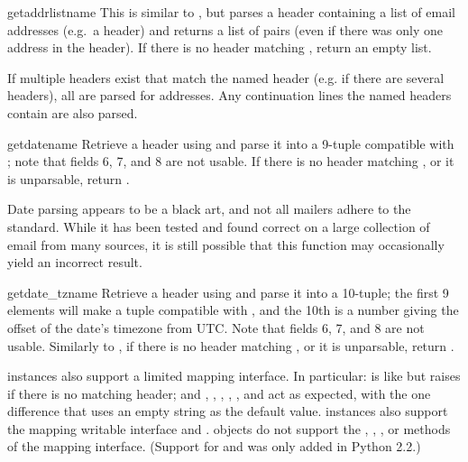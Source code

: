 \begin{methoddesc}{getaddrlist}{name}
This is similar to , but parses a header
containing a list of email addresses (e.g.\ a  header) and
returns a list of  pairs
(even if there was only one address in the header).  If there is no
header matching , return an empty list.

If multiple headers exist that match the named header (e.g. if there
are several  headers), all are parsed for addresses.
Any continuation lines the named headers contain are also parsed.
\end{methoddesc}

\begin{methoddesc}{getdate}{name}
Retrieve a header using  and parse it into a 9-tuple
compatible with ; note that fields 6, 7, and 8 
are not usable.  If there is no header matching
, or it is unparsable, return .

Date parsing appears to be a black art, and not all mailers adhere to
the standard.  While it has been tested and found correct on a large
collection of email from many sources, it is still possible that this
function may occasionally yield an incorrect result.
\end{methoddesc}

\begin{methoddesc}{getdate_tz}{name}
Retrieve a header using  and parse it into a
10-tuple; the first 9 elements will make a tuple compatible with
, and the 10th is a number giving the offset
of the date's timezone from UTC.  Note that fields 6, 7, and 8 
are not usable.  Similarly to , if
there is no header matching , or it is unparsable, return
. 
\end{methoddesc}

 instances also support a limited mapping interface.
In particular:  is like
 but raises  if
there is no matching header; and ,
,
, ,
 , and
 act as
expected, with the one difference that  uses
an empty string as the default value.   instances
also support the mapping writable interface  and .   objects do not
support the , , , or
 methods of the mapping interface.  (Support for
 and  was only added in Python
2.2.)

